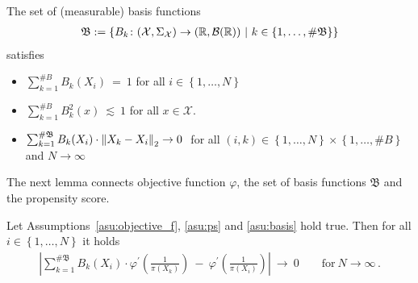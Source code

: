 \begin{assumption}
  \label{asu:basis}
  The set of (measurable) basis functions 
\begin{gather*}
  \mathfrak{B}
  :
  =
  \left\{ 
B_k\colon (\mathcal{X},\Sigma_\mathcal{X})\to(\R,\mathcal{B}(\R))
\ 
|
\ 
k\in \left\{ 1,\ldots,\# \mathfrak{B} \right\}
  \right\}
\end{gather*}
  satisfies
  \begin{itemize}
    \item
      $
      \sum_{k=1}^{\# B} 
      B_k(X_i)
      \ 
      =
      \ 
      1
      $
      for all 
      $i\in \left\{ 1,\ldots ,N \right\}$
    \item
      $
      \sum_{k=1}^{\# B} 
      B_k^2(x)
      \ 
      \lesssim
      \ 
      1
      $
      for all $x\in\mathcal{X}$.
    \item
      $
   \sum_{k=1}^{\# \mathfrak{B}} 
      B_k(X_i)
      \cdot
      \left\lVert X_k - X_i\right\rVert_2
      \to
      0
      \ 
      $
      for all 
      $
      (i,k)
      \in
      \left\{ 1,\ldots, N \right\}
      \times
      \left\{ 1,\ldots,\# B \right\}
      $
      and
      $N\to\infty$
  \end{itemize}
\end{assumption}


The next lemma connects objective function $\varphi$, the set of basis functions $\mathfrak{B}$ and the propensity score.

\begin{lemma}
  Let Assumptions~\ref{asu:objective_f}, \ref{asu:ps} and \ref{asu:basis} hold true.
  Then for all
  $i\in \left\{ 1,\ldots,N \right\}$ it holds
  \begin{gather*}
   \left| 
   \sum_{k=1}^{\# \mathfrak{B}} 
   B_k(X_i)
   \cdot
   \varphi^{'}
   \left( 
     \frac{1}{\pi(X_k)}
   \right)
   \ 
   -
   \ 
   \varphi^{'}
   \left( 
     \frac{1}{\pi(X_i)}
   \right)
   \right| 
   \ 
   \to
   \ 
   0
   \qquad
   \text{for}
   \ 
   N\to\infty
   \,.
  \end{gather*}
\end{lemma}

